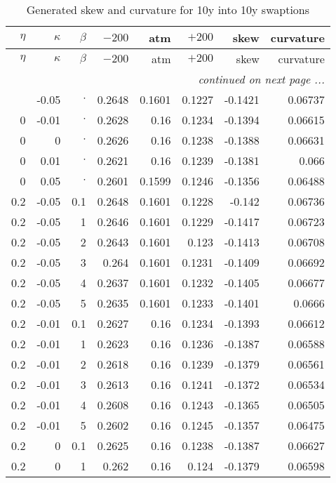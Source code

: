 \documentclass{amsart}
\theoremstyle{plain}
\numberwithin{equation}{section}
\begin{document}
\begin{longtable}{r | r | r | r | r | r | r | r}
\caption{Generated skew and curvature for 10y into 10y swaptions} \\
$\eta$ & $\kappa$ & $\beta$ & $-200$ & atm & $+200$ & skew & curvature \\ \hline
\endfirsthead
$\eta$ & $\kappa$ & $\beta$ & $-200$ & atm & $+200$ & skew & curvature \\ \hline
\endhead
\multicolumn{8}{r}{\textit{continued on next page ...}} \\
\endfoot
\endlastfoot
0 & -0.05 & $\cdot$ & 0.2648 & 0.1601 & 0.1227 & -0.1421 & 0.06737 \\ \hline
0 & -0.01 & $\cdot$ & 0.2628 & 0.16 & 0.1234 & -0.1394 & 0.06615 \\ \hline
0 & 0 & $\cdot$ & 0.2626 & 0.16 & 0.1238 & -0.1388 & 0.06631 \\ \hline
0 & 0.01 & $\cdot$ & 0.2621 & 0.16 & 0.1239 & -0.1381 & 0.066 \\ \hline
0 & 0.05 & $\cdot$ & 0.2601 & 0.1599 & 0.1246 & -0.1356 & 0.06488 \\ \hline
0.2 & -0.05 & 0.1 & 0.2648 & 0.1601 & 0.1228 & -0.142 & 0.06736 \\
0.2 & -0.05 & 1 & 0.2646 & 0.1601 & 0.1229 & -0.1417 & 0.06723 \\
0.2 & -0.05 & 2 & 0.2643 & 0.1601 & 0.123 & -0.1413 & 0.06708 \\
0.2 & -0.05 & 3 & 0.264 & 0.1601 & 0.1231 & -0.1409 & 0.06692 \\
0.2 & -0.05 & 4 & 0.2637 & 0.1601 & 0.1232 & -0.1405 & 0.06677 \\
0.2 & -0.05 & 5 & 0.2635 & 0.1601 & 0.1233 & -0.1401 & 0.0666 \\ \hline
0.2 & -0.01 & 0.1 & 0.2627 & 0.16 & 0.1234 & -0.1393 & 0.06612 \\
0.2 & -0.01 & 1 & 0.2623 & 0.16 & 0.1236 & -0.1387 & 0.06588 \\
0.2 & -0.01 & 2 & 0.2618 & 0.16 & 0.1239 & -0.1379 & 0.06561 \\
0.2 & -0.01 & 3 & 0.2613 & 0.16 & 0.1241 & -0.1372 & 0.06534 \\
0.2 & -0.01 & 4 & 0.2608 & 0.16 & 0.1243 & -0.1365 & 0.06505 \\
0.2 & -0.01 & 5 & 0.2602 & 0.16 & 0.1245 & -0.1357 & 0.06475 \\ \hline
0.2 & 0 & 0.1 & 0.2625 & 0.16 & 0.1238 & -0.1387 & 0.06627 \\
0.2 & 0 & 1 & 0.262 & 0.16 & 0.124 & -0.1379 & 0.06598 \\

\end{longtable}
\end{document}
